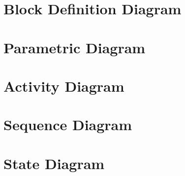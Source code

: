 \section{Block Definition Diagram}

\section{Parametric Diagram}

\section{Activity Diagram}

\section{Sequence Diagram}

\section{State Diagram}
